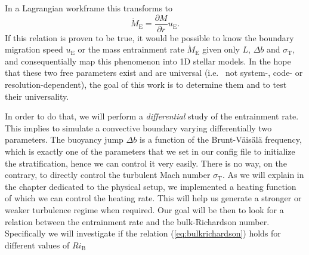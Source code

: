 In a Lagrangian workframe this transforms to
\begin{equation}
	\dot{M}_\mathrm{E}=\frac{\partial M}{\partial r} u_{\mathrm{E}}.
\end{equation}
If this relation is proven to be true, it would be possible to know the boundary migration speed $u_{\mathrm{E}}$ or the mass entrainment rate $\dot{M}_\mathrm{E}$ given only $L$, $\Delta b$ and $\sigma_{\mathrm{T}}$, and consequentially map this phenomenon into 1D stellar models. In the hope that these two free parameters exist and are universal (i.e. \ not system-, code- or resolution-dependent), the goal of this work is to determine them and to test their universality.

In order to do that, we will perform a \textit{differential} study of the entrainment rate. This implies to simulate a convective boundary varying differentially two parameters. The buoyancy jump $\Delta b$ is a function of the Brunt-Väisälä frequency, which is exactly one of the parameters that we set in our config file to initialize the stratification, hence we can control it very easily. There is no way, on the contrary, to directly control the turbulent Mach number $\sigma_{\mathrm{T}}$. As we will explain in the chapter dedicated to the physical setup, we implemented a heating function of which we can control the heating rate. This will help us generate a stronger or weaker turbulence regime when required. Our goal will be then to look for a relation between the entrainment rate and the bulk-Richardson number. Specifically we will investigate if the relation (\ref{eq:bulkrichardson}) holds for different values of $Ri_{\mathrm{B}}$

